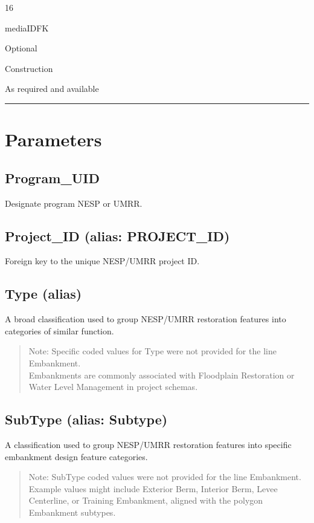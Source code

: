 \documentclass[
  letterpaper,
  DIV=11,
  numbers=noendperiod]{scrreprt}
\begin{document}
16

mediaIDFK

Optional

Construction

As required and available

\begin{center}\rule{0.5\linewidth}{0.5pt}\end{center}

\section{Parameters}\label{parameters-2}

\subsection{Program\_UID}\label{program_uid-2}

Designate program NESP or UMRR.

\subsection{Project\_ID (alias:
PROJECT\_ID)}\label{project_id-alias-project_id-2}

Foreign key to the unique NESP/UMRR project ID.

\subsection{Type (alias)}\label{type-alias-2}

A broad classification used to group NESP/UMRR restoration features into
categories of similar function.

\begin{quote}
Note: Specific coded values for Type were not provided for the line
Embankment.\\
Embankments are commonly associated with Floodplain Restoration or Water
Level Management in project schemas.
\end{quote}

\subsection{SubType (alias: Subtype)}\label{subtype-alias-subtype-2}

A classification used to group NESP/UMRR restoration features into
specific embankment design feature categories.

\begin{quote}
Note: SubType coded values were not provided for the line Embankment.\\
Example values might include Exterior Berm, Interior Berm, Levee
Centerline, or Training Embankment, aligned with the polygon Embankment
subtypes.
\end{quote}
\end{document}
